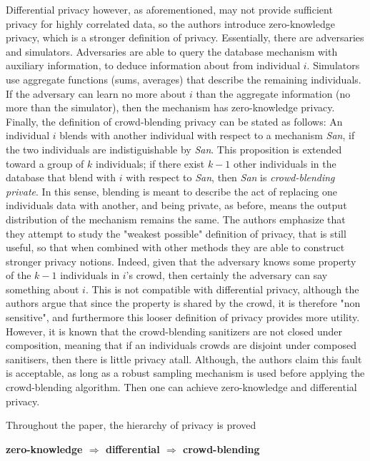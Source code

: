 \documentclass[12pt]{article}
\begin{document}
Differential privacy however, as aforementioned, may not provide sufficient
privacy for highly correlated data, so the authors introduce zero-knowledge privacy,
which is a stronger definition of privacy\cite{TCC:GehLuiPas11}. Essentially, there are adversaries and
simulators. Adversaries are able to query the database mechanism with auxiliary information,
to deduce information about from individual $i$. Simulators
use aggregate functions (sums, averages) that describe the remaining individuals.
If the adversary can learn no more about $i$ than the aggregate information (no more than
the simulator), then the mechanism has zero-knowledge privacy. \\


Finally, the definition of crowd-blending privacy can be stated as follows: An individual $i$
blends with another individual with respect to a mechanism \textit{San}, if the two
individuals are indistiguishable by \textit{San}. This proposition is extended
toward a group of $k$ individuals; if there exist $k - 1$ other individuals
in the database that blend with $i$ with respect to \textit{San}, then \textit{San}
is \textit{crowd-blending private}. In this sense, blending is meant to describe the
act of replacing one individuals data with another, and being private, as before, means
the output distribution of the mechanism remains the same. The authors emphasize
that they attempt to study the "weakest possible" definition of privacy, that is still
useful, so that when combined with other methods they are able to construct stronger
privacy notions. Indeed, given that the adversary knows some property of the $k - 1$
individuals in $i$'s crowd, then certainly the adversary can say something about $i$. This
is not compatible with differential privacy, although the authors argue that since the property
is shared by the crowd, it is therefore "non sensitive", and furthermore this looser
definition of privacy provides more utility. However, it is known that the crowd-blending
sanitizers are not closed under composition, meaning that if an individuals crowds
are disjoint under composed sanitisers, then there is little privacy atall. Although, the authors claim this fault is
acceptable, as long as a robust sampling mechanism is
used before applying the crowd-blending algorithm. Then one can achieve zero-knowledge
and differential privacy.

Throughout the paper, the hierarchy of privacy is proved\\
\begin{center}
\small\textbf{zero-knowledge  $\Rightarrow$ differential  $\Rightarrow$ crowd-blending }
\end{center}
\end{document}
